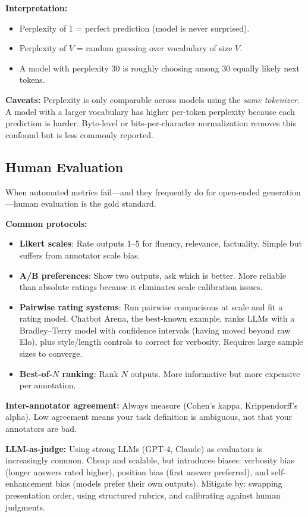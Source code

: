 \textbf{Interpretation:}
\begin{itemize}
    \item Perplexity of 1 = perfect prediction (model is never surprised).
    \item Perplexity of $V$ = random guessing over vocabulary of size $V$.
    \item A model with perplexity 30 is roughly choosing among 30 equally likely next tokens.
\end{itemize}

\textbf{Caveats:} Perplexity is only comparable across models using the \textit{same tokenizer}. A model with a larger vocabulary has higher per-token perplexity because each prediction is harder. Byte-level or bits-per-character normalization removes this confound but is less commonly reported.

\subsection{Human Evaluation}

When automated metrics fail---and they frequently do for open-ended generation---human evaluation is the gold standard.

\textbf{Common protocols:}
\begin{itemize}
    \item \textbf{Likert scales}: Rate outputs 1--5 for fluency, relevance, factuality. Simple but suffers from annotator scale bias.
    \item \textbf{A/B preferences}: Show two outputs, ask which is better. More reliable than absolute ratings because it eliminates scale calibration issues.
    \item \textbf{Pairwise rating systems}: Run pairwise comparisons at scale and fit a rating model. Chatbot Arena, the best-known example, ranks LLMs with a Bradley--Terry model with confidence intervals (having moved beyond raw Elo), plus style/length controls to correct for verbosity. Requires large sample sizes to converge.
    \item \textbf{Best-of-$N$ ranking}: Rank $N$ outputs. More informative but more expensive per annotation.
\end{itemize}

\textbf{Inter-annotator agreement:} Always measure (Cohen's kappa, Krippendorff's alpha). Low agreement means your task definition is ambiguous, not that your annotators are bad.

\textbf{LLM-as-judge:} Using strong LLMs (GPT-4, Claude) as evaluators is increasingly common. Cheap and scalable, but introduces biases: verbosity bias (longer answers rated higher), position bias (first answer preferred), and self-enhancement bias (models prefer their own outputs). Mitigate by: swapping presentation order, using structured rubrics, and calibrating against human judgments.

